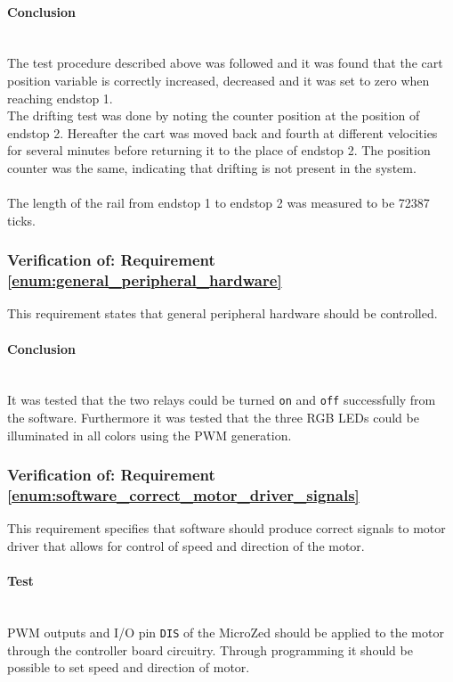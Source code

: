 \paragraph{Conclusion}~\\
The test procedure described above was followed and it was found that the cart position variable is correctly increased, decreased and it was set to zero when reaching endstop 1.
\\
The drifting test was done by noting the counter position at the position of endstop 2. 
Hereafter the cart was moved back and fourth at different velocities for several minutes before returning it to the place of endstop 2. 
The position counter was the same, indicating that drifting is not present in the system.
\\~\\
The length of the rail from endstop 1 to endstop 2 was measured to be 72387 ticks.

\subsubsection{Verification of: Requirement \ref{enum:general_peripheral_hardware}} %
\label{ssub:verification_of_requirement_enum:general_peripheral_hardware}
This requirement states that general peripheral hardware should be controlled.

\paragraph{Conclusion}~\\
It was tested that the two relays could be turned \texttt{on} and \texttt{off} successfully from the software.
Furthermore it was tested that the three RGB LEDs could be illuminated in all colors using the PWM generation.


\subsubsection{Verification of: Requirement \ref{enum:software_correct_motor_driver_signals}} %
\label{ssub:verification_of_requirement_enum:software_correct_motor_driver_signals}
This requirement specifies that software should produce correct signals to motor driver that allows for control of speed and direction of the motor.

\paragraph{Test}~\\
PWM outputs and I/O pin \texttt{DIS} of the MicroZed should be applied to the motor through the controller board circuitry.
Through programming it should be possible to set speed and direction of motor.

